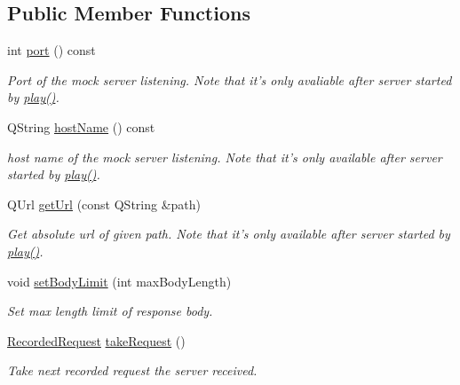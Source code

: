 \subsection*{Public Member Functions}
\begin{DoxyCompactItemize}
\item 
int \hyperlink{class_qt_mock_web_server_a83034aa1dbf8114d6b1bc01dd97cd2f3}{port} () const 
\begin{DoxyCompactList}\small\item\em Port of the mock server listening. Note that it's only avaliable after server started by \hyperlink{class_qt_mock_web_server_a5bad6c701969176fefd90d47417981c5}{play()}. \end{DoxyCompactList}\item 
Q\+String \hyperlink{class_qt_mock_web_server_a4779ef849c0bda6a605f453c8752491d}{host\+Name} () const 
\begin{DoxyCompactList}\small\item\em host name of the mock server listening. Note that it's only available after server started by \hyperlink{class_qt_mock_web_server_a5bad6c701969176fefd90d47417981c5}{play()}. \end{DoxyCompactList}\item 
Q\+Url \hyperlink{class_qt_mock_web_server_ace67dccbdce71316237a03e9830d8170}{get\+Url} (const Q\+String \&path)
\begin{DoxyCompactList}\small\item\em Get absolute url of given path. Note that it's only available after server started by \hyperlink{class_qt_mock_web_server_a5bad6c701969176fefd90d47417981c5}{play()}. \end{DoxyCompactList}\item 
void \hyperlink{class_qt_mock_web_server_a9b3f8f6054887c147b2c3fb36fbce271}{set\+Body\+Limit} (int max\+Body\+Length)
\begin{DoxyCompactList}\small\item\em Set max length limit of response body. \end{DoxyCompactList}\item 
\hyperlink{class_recorded_request}{Recorded\+Request} \hyperlink{class_qt_mock_web_server_aa1483ddd073de09247c53c0aa3a7b05b}{take\+Request} ()
\begin{DoxyCompactList}\small\item\em Take next recorded request the server received. \end{DoxyCompactList}\item 

\end{DoxyCompactItemize}
